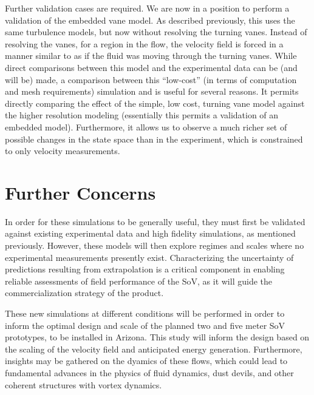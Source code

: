 \documentclass{article}
\begin{document}
%
%
Further validation cases are required. We are now in a position to perform
a validation of the embedded vane model. As described previously, this
uses the same turbulence models, but now without resolving the turning
vanes. Instead of resolving the vanes, for a region in the flow, the
velocity field is forced in a manner similar to as if the fluid was
moving through the turning vanes. While direct comparisons between this
model and the experimental data can be (and will be) made, a comparison between this
``low-cost'' (in terms of computation and mesh requirements) simulation
and is useful for several reasons. It permits directly comparing the effect of
the simple, low cost, turning vane model against the higher resolution
modeling (essentially this permits a validation of an embedded
model). Furthermore, it allows us to observe a much richer set of
possible changes in the state space than in the experiment, which is
constrained to only velocity measurements. 

%
%
\section{Further Concerns}


In order for these simulations to be generally useful, they must first
be validated against existing experimental data and high fidelity
simulations, as mentioned previously. 
However, these models will then explore regimes and scales where no
experimental measurements presently exist. Characterizing the
uncertainty of predictions resulting from extrapolation is a critical
component in enabling reliable assessments of field performance of the
SoV, as it will guide the commercialization strategy of the product.

These new simulations at different conditions will be performed in order
to inform the optimal design and scale of the planned two and five meter
SoV prototypes, to be installed in Arizona. This study will inform the
design based on the scaling of the velocity field and anticipated energy
generation. Furthermore, insights may be gathered on the dyamics of
these flows, which could lead to fundamental advances in the physics of
fluid dynamics, dust devils, and other coherent structures with vortex 
dynamics\cite{Mullen1977181,smithleslie,kanak}. 
\end{document}
